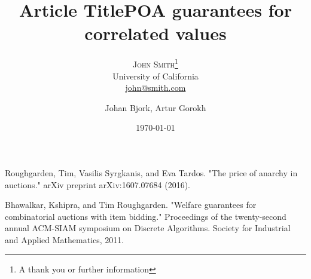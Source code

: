 \documentclass[twoside,onecolumn]{article}
\title{Article Title} %
\author{%
\textsc{John Smith}\thanks{A thank you or further information} \\[1ex] %
\normalsize University of California \\ %
\normalsize \href{mailto:john@smith.com}{john@smith.com} %
}
\date{\today} %
\author{Johan Bjork, Artur Gorokh}
\begin{document}
\title{POA guarantees for correlated values
}
\maketitle







%
%
\begin{thebibliography}{9}
Roughgarden, Tim, Vasilis Syrgkanis, and Eva Tardos. "The price of anarchy in auctions." arXiv preprint arXiv:1607.07684 (2016).
 
 Bhawalkar, Kshipra, and Tim Roughgarden. "Welfare guarantees for combinatorial auctions with item bidding." Proceedings of the twenty-second annual ACM-SIAM symposium on Discrete Algorithms. Society for Industrial and Applied Mathematics, 2011.
 
\end{thebibliography}
\end{document}
